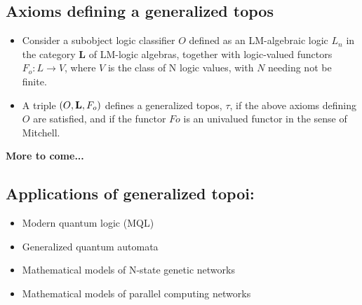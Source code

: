 \documentclass[12pt]{article}
\theoremstyle{plain}
\theoremstyle{definition}
\begin{document}
\subsection{Axioms defining a generalized topos}
\begin{itemize}
\item Consider a subobject logic classifier $O$ defined as an LM-algebraic logic
$L_n$ in the category {\bf L} of LM-logic algebras, together with logic-valued functors $F_o: L \to V$, 
where $V$ is the class of N logic values, with $N$ needing not be finite. 
\item A triple $(O,{\bf L},F_o)$ defines a generalized topos, $\tau$, if the above axioms 
defining $O$ are satisfied, and if the functor $Fo$ is an univalued functor in the sense of Mitchell.
\end{itemize}

{\bf More to come...}


\subsection{Applications of generalized topoi:}
\begin{itemize}
\item Modern quantum logic (MQL)
\item Generalized quantum automata 
\item Mathematical models of N-state genetic networks \cite{BBGG1}
\item Mathematical models of parallel computing networks
\end{itemize}
\end{document}
